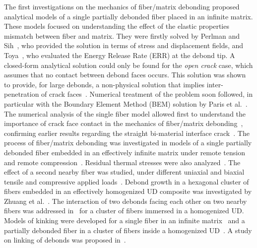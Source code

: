 \documentclass[smallextended]{svjour3}       %
\begin{document}
The first investigations on the mechanics of fiber/matrix debonding proposed analytical models of a single partially debonded fiber placed in an infinite matrix. These models focused on understanding the effect of the elastic properties mismatch between fiber and matrix. They were firstly solved by Perlman and Sih~\cite{Perlman1967}, who provided the solution in terms of stress and displacement fields, and Toya~\cite{Toya1974}, who evaluated the Energy Release Rate (ERR) at the debond tip. A closed-form analytical solution could only be found for the \textit{open crack} case, which assumes that no contact between debond faces occurs. This solution was shown to provide, for large debonds, a non-physical solution that implies inter-penetration of crack faces~\cite{Toya1974,Comninou1977}. Numerical treatment of the problem soon followed, in particular with the Boundary Element Method (BEM) solution by Paris et al.~\cite{Paris1996}. The numerical analysis of the single fiber model allowed first to understand the importance of crack face contact in the mechanics of fiber/matrix debonding~\cite{Varna1997a}, confirming earlier results regarding the straight bi-material interface crack~\cite{Comninou1977}. The process of fiber/matrix debonding was investigated in models of a single partially debonded fiber embedded in an effectively infinite matrix under remote tension~\cite{Paris1996} and remote compression~\cite{Correa2007}. Residual thermal stresses were also analyzed~\cite{Correa2011}. The effect of a second nearby fiber was studied, under different uniaxial and biaxial tensile and compressive applied loads~\cite{Correa2013,Correa2014,Sandino2016,Sandino2018}. Debond growth in a hexagonal cluster of fibers embedded in an effectively homogenized UD composite was investigated by Zhuang et al.~\cite{Zhuang2018}. The interaction of two debonds facing each other on two nearby fibers was addressed in~\cite{Varna2017} for a cluster of fibers immersed in a homogenized UD.\\
Models of kinking were developed for a single fiber in an infinite matrix~\cite{Paris2007} and a partially debonded fiber in a cluster of fibers inside a homogenized UD~\cite{Zhuang2018a}. A study on linking of debonds was proposed in~\cite{Varna2017}.\\
\end{document}
